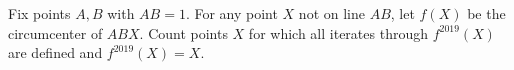 Fix points $A,B$ with $AB=1$. For any point $X$ not on line $AB$, let $f(X)$ be the circumcenter of $ABX$. Count points $X$ for which all iterates through $f^{2019}(X)$ are defined and $f^{2019}(X)=X$.
